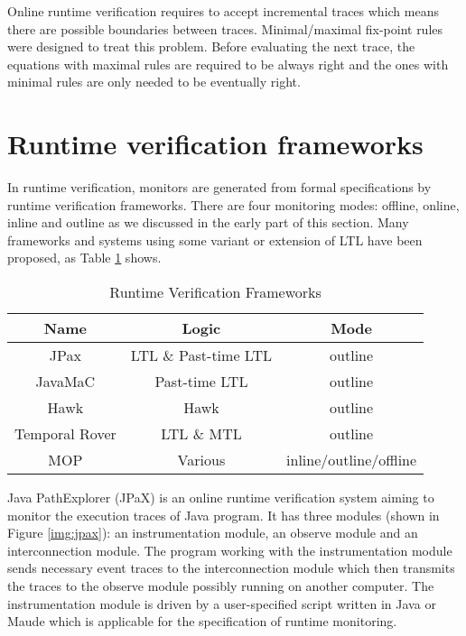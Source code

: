 Online runtime verification requires to accept incremental traces which means there are possible boundaries between traces. Minimal/maximal fix-point rules were designed to treat this problem. Before evaluating the next trace, the equations with maximal rules are required to be always right and the ones with minimal rules are only needed to be eventually right.

\section{Runtime verification frameworks}\label{sec:rv:frameworks}

In runtime verification, monitors are generated from formal specifications by runtime verification frameworks. There are four monitoring modes: offline, online, inline and outline as we discussed in the early part of this section. Many frameworks and systems using some variant or extension of LTL have been proposed, as Table \ref{table:rvframeworks} shows. 

\begin{table}[h]
\centering
\begin{tabular}{|c|c|c|}
\hline
Name & Logic & Mode \\
\hline
JPax\citep{havelund2001java} & LTL \& Past-time LTL & outline \\
\hline
JavaMaC\citep{kim2004java} & Past-time LTL & outline \\
\hline
Hawk \citep{d2005event} & Hawk & outline \\
\hline
Temporal Rover\citep{drusinsky2000temporal} & LTL \& MTL & outline \\
\hline
MOP \citep{chen2007mop} & Various & inline/outline/offline \\
\hline
\end{tabular}
\caption{Runtime Verification Frameworks}
\label{table:rvframeworks}
\end{table}

Java PathExplorer (JPaX) \citep{havelund2001java} is an online runtime verification system aiming to monitor the execution traces of Java program. It has three modules (shown in Figure \ref{img:jpax}): an instrumentation module, an observe module and an interconnection module. The program working with the instrumentation module sends necessary event traces to the interconnection module which then transmits the traces to the observe module possibly running on another computer. The instrumentation module is driven by a user-specified script written in Java or Maude which is applicable for the specification of runtime monitoring.

